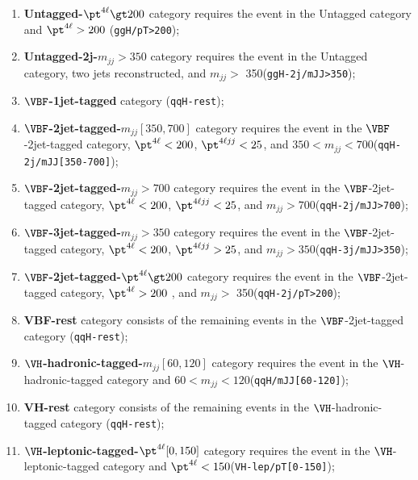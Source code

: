 {\begin{enumerate}
\item {\bf Untagged-$\pt^{4\ell}\gt200$} category requires the event in the Untagged category and $\pt^{4\ell}>200$ \GeV ({\tt ggH/pT>200});

\item {\bf Untagged-2j-$m_{jj}\gt350$} category requires the event in the Untagged category, two jets reconstructed, and $m_{jj} >$ 350\GeV ({\tt ggH-2j/mJJ>350});

\item {\bf $\VBF$-1jet-tagged} category ({\tt qqH-rest});

\item {\bf $\VBF$-2jet-tagged-$m_{jj}[350,700]$} category requires the event in the $\VBF$-2jet-tagged category, $\pt^{4\ell}<200$\GeV, $\pt^{4\ell jj}<25$\GeV, and $350<m_{jj}<700$\GeV ({\tt qqH-2j/mJJ[350-700]});

\item {\bf $\VBF$-2jet-tagged-$m_{jj}\gt700$} category requires the event in the $\VBF$-2jet-tagged category, $\pt^{4\ell}<200$\GeV, $\pt^{4\ell jj}<25$\GeV, and $m_{jj}>700$\GeV ({\tt qqH-2j/mJJ>700});

\item {\bf $\VBF$-3jet-tagged-$m_{jj}\gt350$} category requires the event in the $\VBF$-2jet-tagged category, $\pt^{4\ell}<200$\GeV, $\pt^{4\ell jj}>25$\GeV, and $m_{jj}>350$\GeV ({\tt qqH-3j/mJJ>350});

\item {\bf $\VBF$-2jet-tagged-$\pt^{4\ell}\gt200$} category requires the event in the $\VBF$-2jet-tagged category, $\pt^{4\ell}>200$ \GeV, and $m_{jj} >$ 350\GeV ({\tt qqH-2j/pT>200});

\item {\bf VBF-rest} category consists of the remaining events in the $\VBF$-2jet-tagged category ({\tt qqH-rest});

\item {\bf $\VH$-hadronic-tagged-$m_{jj}[60,120]$} category requires the event in the $\VH$-hadronic-tagged category and $60<m_{jj}<120$\GeV ({\tt qqH/mJJ[60-120]});

\item {\bf VH-rest} category consists of the remaining events in the $\VH$-hadronic-tagged category ({\tt qqH-rest});

\item {\bf $\VH$-leptonic-tagged-$\pt^{4\ell}[0,150]$} category requires the event in the $\VH$-leptonic-tagged category and $\pt^{4\ell} < 150$\GeV ({\tt VH-lep/pT[0-150]});


\end{enumerate}}
